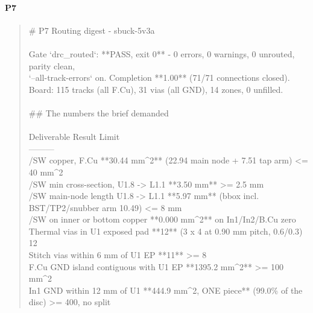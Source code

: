 \documentclass[11pt,a4paper]{article}
\begin{document}
\paragraph*{P7}
\begin{quote}\small\ttfamily\raggedright
\# P7 Routing digest - sbuck-5v3a\\
~\\
Gate `drc\_routed`: {*}{*}PASS, exit 0{*}{*} - 0 errors, 0 warnings, 0 unrouted, parity clean,\\
`--all-track-errors` on. Completion {*}{*}1.00{*}{*} (71/71 connections closed).\\
Board: 115 tracks (all F.Cu), 31 vias (all GND), 14 zones, 0 unfilled.\\
~\\
\#\# The numbers the brief demanded\\
~\\
\textbar{} Deliverable \textbar{} Result \textbar{} Limit \textbar{}\\
\textbar{}---\textbar{}---\textbar{}---\textbar{}\\
\textbar{} /SW copper, F.Cu \textbar{} {*}{*}30.44 mm\textasciicircum{}2{*}{*} (22.94 main node + 7.51 tap arm) \textbar{} \textless{}= 40 mm\textasciicircum{}2 \textbar{}\\
\textbar{} /SW min cross-section, U1.8 -\textgreater{} L1.1 \textbar{} {*}{*}3.50 mm{*}{*} \textbar{} \textgreater{}= 2.5 mm \textbar{}\\
\textbar{} /SW main-node length U1.8 -\textgreater{} L1.1 \textbar{} {*}{*}5.97 mm{*}{*} (bbox incl. BST/TP2/snubber arm 10.49) \textbar{} \textless{}= 8 mm \textbar{}\\
\textbar{} /SW on inner or bottom copper \textbar{} {*}{*}0.000 mm\textasciicircum{}2{*}{*} on In1/In2/B.Cu \textbar{} zero \textbar{}\\
\textbar{} Thermal vias in U1 exposed pad \textbar{} {*}{*}12{*}{*} (3 x 4 at 0.90 mm pitch, 0.6/0.3) \textbar{} 12 \textbar{}\\
\textbar{} Stitch vias within 6 mm of U1 EP \textbar{} {*}{*}11{*}{*} \textbar{} \textgreater{}= 8 \textbar{}\\
\textbar{} F.Cu GND island contiguous with U1 EP \textbar{} {*}{*}1395.2 mm\textasciicircum{}2{*}{*} \textbar{} \textgreater{}= 100 mm\textasciicircum{}2 \textbar{}\\
\textbar{} In1 GND within 12 mm of U1 \textbar{} {*}{*}444.9 mm\textasciicircum{}2, ONE piece{*}{*} (99.0\% of the disc) \textbar{} \textgreater{}= 400, no split \textbar{}\\

\end{quote}
\end{document}
